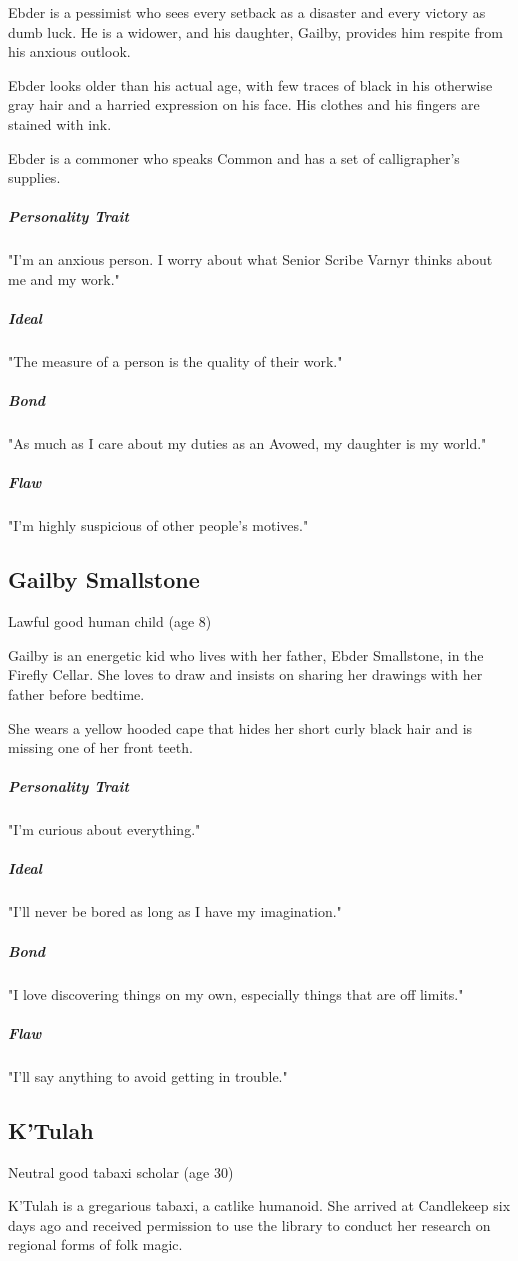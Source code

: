 \documentclass[10pt,a4paper,twoside,bg=print,twocolumn,openany,nodeprecatedcode]{dndbook}
\begin{document}
Ebder is a pessimist who sees every setback as a disaster and every victory as dumb luck. He is a widower, and his daughter, Gailby, provides him respite from his anxious outlook.

Ebder looks older than his actual age, with few traces of black in his otherwise gray hair and a harried expression on his face. His clothes and his fingers are stained with ink.

Ebder is a commoner who speaks Common and has a set of calligrapher's supplies.

\subparagraph{Personality Trait}
"I'm an anxious person. I worry about what Senior Scribe Varnyr thinks about me and my work."

\subparagraph{Ideal}
"The measure of a person is the quality of their work."

\subparagraph{Bond}
"As much as I care about my duties as an Avowed, my daughter is my world."

\subparagraph{Flaw}
"I'm highly suspicious of other people's motives."

\subsection{Gailby Smallstone}
Lawful good human child (age 8)

Gailby is an energetic kid who lives with her father, Ebder Smallstone, in the Firefly Cellar. She loves to draw and insists on sharing her drawings with her father before bedtime.

She wears a yellow hooded cape that hides her short curly black hair and is missing one of her front teeth.

\subparagraph{Personality Trait}
"I'm curious about everything."

\subparagraph{Ideal}
"I'll never be bored as long as I have my imagination."

\subparagraph{Bond}
"I love discovering things on my own, especially things that are off limits."

\subparagraph{Flaw}
"I'll say anything to avoid getting in trouble."

\subsection{K'Tulah}
Neutral good tabaxi scholar (age 30)

K'Tulah is a gregarious tabaxi, a catlike humanoid. She arrived at Candlekeep six days ago and received permission to use the library to conduct her research on regional forms of folk magic.
\end{document}

